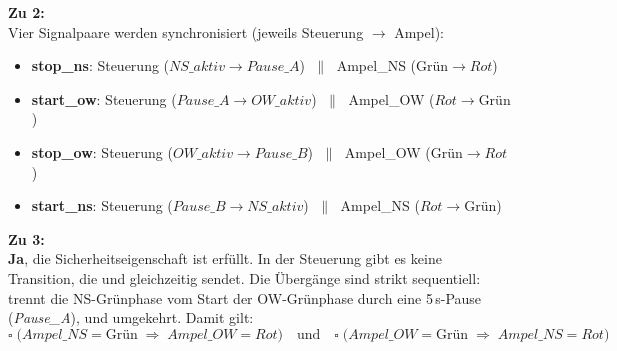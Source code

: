 \begin{loesung}
\begin{center}
\begin{minipage}[t]{0.44\textwidth}
\centering
{}
\end{minipage}
\hfill
\begin{minipage}[t]{0.44\textwidth}
\centering
{}
\end{minipage}
\end{center}

\textbf{Zu 2:}\\
Vier Signalpaare werden synchronisiert (jeweils Steuerung $\to$ Ampel):
\begin{itemize}
  \item \textbf{stop\_ns}: Steuerung ($\mathit{NS\_aktiv} \to \mathit{Pause\_A}$)
        $\;\|\;$ Ampel\_NS ($\text{Grün} \to \mathit{Rot}$)
  \item \textbf{start\_ow}: Steuerung ($\mathit{Pause\_A} \to \mathit{OW\_aktiv}$)
        $\;\|\;$ Ampel\_OW ($\mathit{Rot} \to \text{Grün}$)
  \item \textbf{stop\_ow}: Steuerung ($\mathit{OW\_aktiv} \to \mathit{Pause\_B}$)
        $\;\|\;$ Ampel\_OW ($\text{Grün} \to \mathit{Rot}$)
  \item \textbf{start\_ns}: Steuerung ($\mathit{Pause\_B} \to \mathit{NS\_aktiv}$)
        $\;\|\;$ Ampel\_NS ($\mathit{Rot} \to \text{Grün}$)
\end{itemize}

\textbf{Zu 3:}\\
\textbf{Ja}, die Sicherheitseigenschaft ist erfüllt. In der Steuerung gibt es keine Transition,
die  und  gleichzeitig sendet. Die Übergänge sind strikt
sequentiell:  trennt die NS-Grünphase vom Start der OW-Grünphase durch eine
5\,s-Pause (\textit{Pause\_A}), und umgekehrt. Damit gilt:
\[
  \square\;\bigl(\mathit{Ampel\_NS} = \text{Grün}
  \;\Rightarrow\; \mathit{Ampel\_OW} = \mathit{Rot}\bigr)
  \quad\text{und}\quad
  \square\;\bigl(\mathit{Ampel\_OW} = \text{Grün}
  \;\Rightarrow\; \mathit{Ampel\_NS} = \mathit{Rot}\bigr)
\]


\end{loesung}

